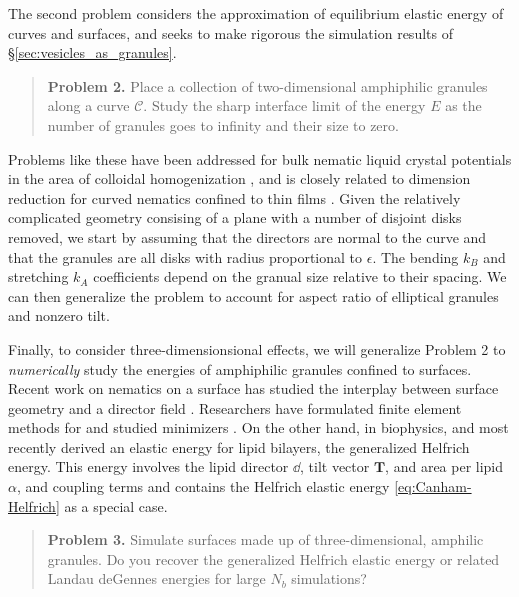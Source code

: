 The second problem considers the approximation
of equilibrium elastic energy of curves and surfaces,
and seeks to make rigorous the simulation results of
\S \ref{sec:vesicles_as_granules}.
\begin{quotation}
\textbf{Problem 2.} Place a collection of
two-dimensional amphiphilic granules along a curve $\mathcal{C}$.
Study the sharp interface limit of the energy $E$ 
as the number of granules goes to infinity and their size to zero.
\end{quotation}
Problems like these have been addressed for bulk nematic liquid
crystal potentials in the area of colloidal homogenization
\cite{Canevari2019DesignOE,doi:10.1137/18M1163919,doi:10.1137/18M1163919,
  BERLYAND200597,doi:10.1137/130910348},
and is closely related to 
dimension reduction for curved nematics confined to thin films
\cite{Golovaty2017DimensionRF, Golovaty2015DimensionRF,
doi:10.1142/S0218202516500470, FoFrLe07}.
Given the relatively complicated geometry consising
of a plane with a number of disjoint disks removed, 
we start by assuming that the directors are normal to the curve
and that the granules are all disks with radius proportional to $\epsilon$. 
The bending $k_B$ and stretching $k_A$ coefficients
depend on the granual size relative to their spacing.
We can then generalize the problem to account for aspect ratio of
elliptical granules and nonzero tilt. 

Finally, to consider three-dimensionsional effects, we
will generalize Problem 2 to \emph{numerically}
study the energies of amphiphilic granules confined to surfaces.
Recent work on nematics on a surface has studied
the interplay between 
surface geometry and a director field
\cite{Nestler2020PropertiesOS, Nitschke2018NematicLC,
  Nestler2018OrientationalOO, Nitschke2019HydrodynamicII,
  Nitschke2020LiquidCO}.
Researchers have formulated finite element methods for
\cite{Bartels2012FiniteEM, Nochetto2015NumericsFL,
  Nestler2019AFE}
  and studied minimizers
\cite{Segatti2014EquilibriumCO,Segatti2014AnalysisOA}.
On the other hand, in biophysics,
\cite{Hamm2000ElasticEO,Terzi2019CurvatureTiltTO,Terzi2019ACQ,Terzi2017NovelTC}
and most recently \cite{Pinigin2020NewCT}
derived an elastic energy for lipid bilayers,
the generalized Helfrich energy.
This energy involves the lipid director $\dd$,
tilt vector $\mathbf{T}$, and area per lipid $\alpha$,
and coupling terms and contains
the Helfrich elastic energy \eqref{eq:Canham-Helfrich}
as a special case.
\begin{quotation}
\textbf{Problem 3.}
Simulate surfaces made up of three-dimensional, amphilic granules.
Do you recover the generalized Helfrich elastic energy
or related Landau deGennes energies for large $N_b$ simulations?
\end{quotation}

